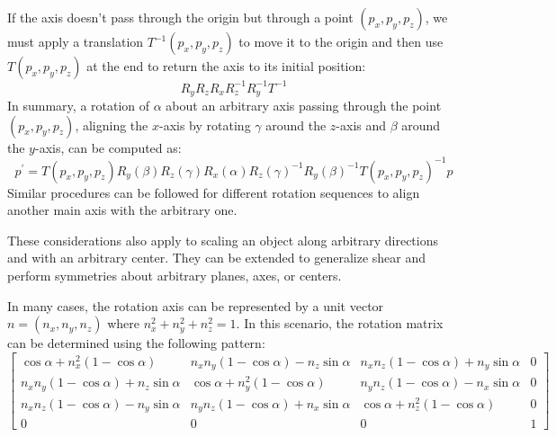 If the axis doesn't pass through the origin but through a point $(p_x,p_y,p_z)$, we must apply a translation $T^{-1}(p_x,p_y,p_z)$ to move it to the origin and then use $T(p_x,p_y,p_z)$ at the end to return the axis to its initial position:
\[R_y{R}_z{R}_x{R}_z^{-1}R_y^{-1}T^{-1}\]
In summary, a rotation of $\alpha$ about an arbitrary axis passing through the point $(p_x,p_y,p_z)$, aligning the $x$-axis by rotating $\gamma$ around the $z$-axis and $\beta$ around the $y$-axis, can be computed as:
\[p^\prime=T(p_x, p_y, p_z) R_y(\beta) R_z(\gamma) R_x(\alpha) R_z{(\gamma)}^{-1} R_y{(\beta)}^{-1} T{(p_x, p_y, p_z)}^{-1} p\]
Similar procedures can be followed for different rotation sequences to align another main axis with the arbitrary one.

These considerations also apply to scaling an object along arbitrary directions and with an arbitrary center. 
They can be extended to generalize shear and perform symmetries about arbitrary planes, axes, or centers.

In many cases, the rotation axis can be represented by a unit vector $n = (n_x, n_y, n_z)$ where $n_x^2 + n_y^2 + n_z^2 = 1$. 
In this scenario, the rotation matrix can be determined using the following pattern:
\[\begin{bmatrix}
    \cos\alpha + n_x^2\left( 1-\cos \alpha \right) & n_x{n}_y\left(1-\cos\alpha\right) -n_z\sin\alpha & n_x{n}_z\left(1-\cos\alpha\right) +n_y\sin\alpha & 0 \\
    n_x{n}_y\left(1-\cos\alpha\right) +n_z\sin\alpha & \cos \alpha + n_y^2\left( 1-\cos\alpha \right) & n_y{n}_z\left(1-\cos\alpha\right) -n_x\sin\alpha & 0 \\
    n_x{n}_z\left(1-\cos\alpha\right) -n_y\sin\alpha & n_y{n}_z\left(1-\cos\alpha\right) +n_x\sin\alpha & \cos\alpha + n_z^2\left( 1-\cos \alpha \right) & 0 \\
    0 & 0 & 0 & 1
\end{bmatrix} \]